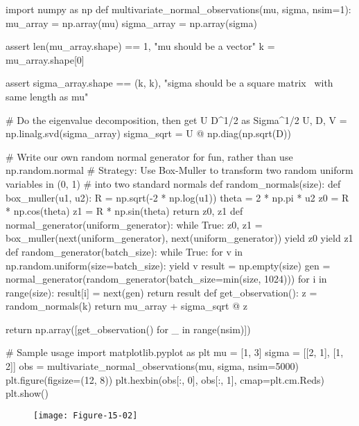 \begin{python}
import numpy as np
def multivariate_normal_observations(mu, sigma, nsim=1):
    mu_array = np.array(mu)
    sigma_array = np.array(sigma)
    
    assert len(mu_array.shape) == 1, "mu should be a vector"
    k = mu_array.shape[0]
    
    assert sigma_array.shape == (k, k), "sigma should be a square matrix \ 
                                         with same length as mu"
    
    # Do the eigenvalue decomposition, then get U D^{1/2} as Sigma^{1/2}
    U, D, V = np.linalg.svd(sigma_array)
    sigma_sqrt = U @ np.diag(np.sqrt(D))
    
    # Write our own random normal generator for fun, rather than use np.random.normal
    # Strategy: Use Box-Muller to transform two random uniform variables in (0, 1) 
    # into two standard normals
    def random_normals(size):
        def box_muller(u1, u2):
            R = np.sqrt(-2 * np.log(u1))
            theta = 2 * np.pi * u2
            z0 = R * np.cos(theta)
            z1 = R * np.sin(theta)
            return z0, z1
        def normal_generator(uniform_generator):
            while True:
                z0, z1 = box_muller(next(uniform_generator), next(uniform_generator))
                yield z0
                yield z1
        def random_generator(batch_size):
            while True:
                for v in np.random.uniform(size=batch_size):
                    yield v
        result = np.empty(size)
        gen = normal_generator(random_generator(batch_size=min(size, 1024)))
        for i in range(size):
            result[i] = next(gen)
        return result
    def get_observation():
        z = random_normals(k)
        return mu_array + sigma_sqrt @ z
    
    return np.array([get_observation() for _ in range(nsim)])
\end{python}

\begin{python}
# Sample usage
import matplotlib.pyplot as plt
mu = [1, 3]
sigma = [[2, 1], [1, 2]]
obs = multivariate_normal_observations(mu, sigma, nsim=5000)
plt.figure(figsize=(12, 8))
plt.hexbin(obs[:, 0], obs[:, 1], cmap=plt.cm.Reds)
plt.show()
\end{python}

\begin{figure}[H]
\centering
\texttt{[image: Figure-15-02]}
\end{figure}


